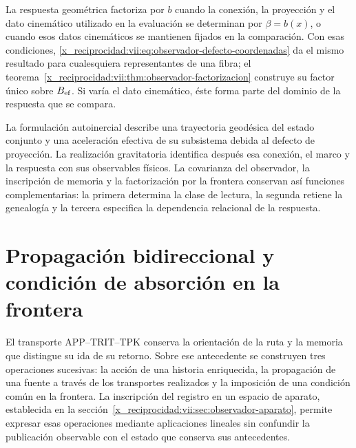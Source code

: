 La respuesta geométrica factoriza por \(b\) cuando la conexión,
la proyección y el dato cinemático utilizado en la evaluación se
determinan por \(\beta=b(x)\), o cuando esos datos cinemáticos se
mantienen fijados en la comparación. Con esas condiciones,
\eqref{x_reciprocidad:vii:eq:observador-defecto-coordenadas} da el mismo resultado
para cualesquiera representantes de una fibra; el
teorema~\ref{x_reciprocidad:vii:thm:observador-factorizacion} construye su factor
único sobre \(B_{\rm ef}\). Si varía el dato cinemático, éste
forma parte del dominio de la respuesta que se compara.

La formulación autoinercial describe una trayectoria geodésica del
estado conjunto y una aceleración efectiva de su subsistema debida
al defecto de proyección. La realización gravitatoria identifica
después esa conexión, el marco y la respuesta con sus observables
físicos. La covarianza del observador, la inscripción de memoria y
la factorización por la frontera conservan así funciones complementarias:
la primera determina la clase de lectura, la segunda retiene la
genealogía y la tercera especifica la dependencia relacional de la
respuesta.




\chapter{Propagación bidireccional y condición de absorción en la frontera}
\label{x_reciprocidad:vii:sec:propagacion-bidireccional}

El transporte APP--TRIT--TPK conserva la orientación de la ruta y la memoria
que distingue su ida de su retorno. Sobre ese antecedente se construyen tres
operaciones sucesivas: la acción de una historia enriquecida, la propagación
de una fuente a través de los transportes realizados y la imposición de una
condición común en la frontera. La inscripción del registro en un espacio de
aparato, establecida en la sección~\ref{x_reciprocidad:vii:sec:observador-aparato}, permite
expresar esas operaciones mediante aplicaciones lineales sin confundir la
publicación observable con el estado que conserva sus antecedentes.


